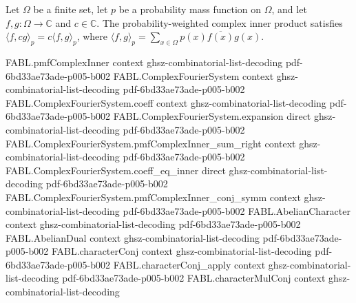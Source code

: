 \begin{theorem}
\label{FABL.ComplexFourierSystem.pmfComplexInner_smul_right}
\leanok
{}
Let $\Omega$ be a finite set, let $p$ be a probability mass function on $\Omega$, and
let $f,g:\Omega\to\mathbb C$ and $c\in\mathbb C$. The probability-weighted complex inner
product satisfies $\langle f,cg\rangle_p=c\langle f,g\rangle_p$, where $\langle
f,g\rangle_p=\sum_{x\in\Omega}p(x)\overline{f(x)}g(x)$.
\end{theorem}

\begin{theorem}
\label{FABL.ComplexFourierSystem.inner_basis_right}
\leanok
{}
\proofstep
  {FABL.pmfComplexInner}
  {context}
  {ghsz-combinatorial-list-decoding}
  {pdf-6bd33ae73ade-p005-b002}
\proofstep
  {FABL.ComplexFourierSystem}
  {context}
  {ghsz-combinatorial-list-decoding}
  {pdf-6bd33ae73ade-p005-b002}
\proofstep
  {FABL.ComplexFourierSystem.coeff}
  {context}
  {ghsz-combinatorial-list-decoding}
  {pdf-6bd33ae73ade-p005-b002}
\proofstep
  {FABL.ComplexFourierSystem.expansion}
  {direct}
  {ghsz-combinatorial-list-decoding}
  {pdf-6bd33ae73ade-p005-b002}
\proofstep
  {FABL.ComplexFourierSystem.pmfComplexInner_sum_right}
  {context}
  {ghsz-combinatorial-list-decoding}
  {pdf-6bd33ae73ade-p005-b002}
\proofstep
  {FABL.ComplexFourierSystem.coeff_eq_inner}
  {direct}
  {ghsz-combinatorial-list-decoding}
  {pdf-6bd33ae73ade-p005-b002}
\proofstep
  {FABL.ComplexFourierSystem.pmfComplexInner_conj_symm}
  {context}
  {ghsz-combinatorial-list-decoding}
  {pdf-6bd33ae73ade-p005-b002}
\proofstep
  {FABL.AbelianCharacter}
  {context}
  {ghsz-combinatorial-list-decoding}
  {pdf-6bd33ae73ade-p005-b002}
\proofstep
  {FABL.AbelianDual}
  {context}
  {ghsz-combinatorial-list-decoding}
  {pdf-6bd33ae73ade-p005-b002}
\proofstep
  {FABL.characterConj}
  {context}
  {ghsz-combinatorial-list-decoding}
  {pdf-6bd33ae73ade-p005-b002}
\proofstep
  {FABL.characterConj_apply}
  {context}
  {ghsz-combinatorial-list-decoding}
  {pdf-6bd33ae73ade-p005-b002}
\proofstep
  {FABL.characterMulConj}
  {context}
  {ghsz-combinatorial-list-decoding}

\end{theorem}
